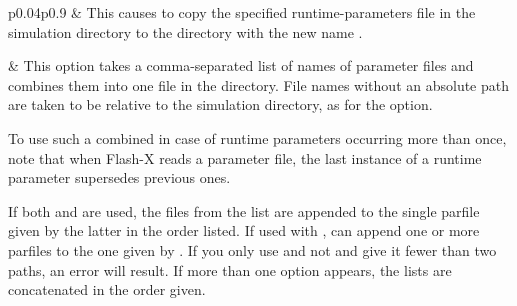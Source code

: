 \begin{longtable}{p{}p{}}
& This causes \setup to copy the specified runtime-parameters file in
the simulation directory to the  directory with the new name
 .\tr

& This option takes a comma-separated list of names of parameter
files and combines them into one  file in the  directory.
File names without an absolute path are taken to be relative to the simulation
directory, as for the  option.

To use such a combined  in case of runtime parameters occurring more
than once, note that when Flash-X reads a parameter file, the last instance of a runtime
parameter supersedes previous ones.

If both  and  are used, the files from the list
are appended to the single parfile given by the latter in the order listed. If used with ,
 can append one or more parfiles to the one given by .
If you only use  and not  and give it fewer than two
paths, an error will result.  If more than one  option appears,
the lists are concatenated in the order given.\tr


\end{longtable}

